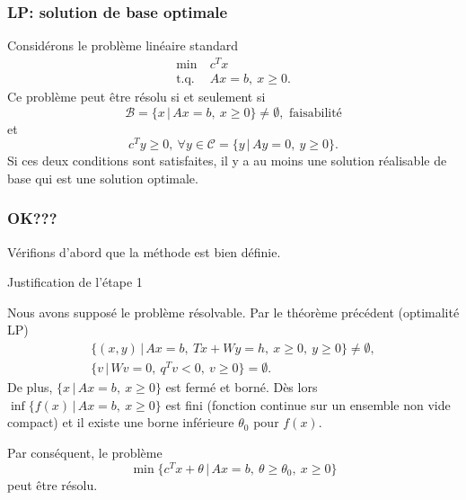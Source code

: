 

\begin{frame}
	\frametitle{LP: solution de base optimale}
	
	\begin{theo}[Optimalité LP]
		Considérons le problème linéaire standard
		\begin{align*}
		\min\ & c^Tx \\
		\mbox{t.q. } & Ax = b,\ x \geq 0.
		\end{align*}
		Ce problème peut être résolu si et seulement si
		\[
		\mathcal{B} = \lbrace x \,|\, Ax = b,\ x \geq 0 \rbrace \ne \emptyset, \mbox{ faisabilité}
		\]
		et
		\[
		c^Ty \geq 0,\ \forall y \in \mathcal{C} = \lbrace y \,|\, Ay = 0,\ y \geq 0 \rbrace.
		\]
		Si ces deux conditions sont satisfaites, il y a au moins une solution
		réalisable de base qui est une solution optimale.
	\end{theo}
\end{frame}

\begin{frame}
	\frametitle{OK???}
	
	Vérifions d'abord que la méthode est bien définie.
	
	\mbox{}
	
	{\red Justification de l'étape 1}
	
	\mbox{}
	
	Nous avons supposé le problème résolvable. Par le théorème précédent
	(optimalité LP)
	\begin{align*}
	\lbrace (x,y) \,|\, Ax = b,\ Tx+Wy = h,\ x \geq 0,\ y \geq 0\rbrace \ne
	\emptyset,\\
	\lbrace v \,|\, Wv = 0,\ q^Tv < 0,\ v \geq 0 \rbrace = \emptyset.
	\end{align*}
	De plus, $\lbrace x \,|\, Ax = b,\ x \geq 0 \rbrace$ est fermé et
	borné. Dès lors
	$\inf \lbrace f(x) \,|\, Ax = b,\ x \geq 0 \rbrace$ est fini (fonction
	continue sur un ensemble non vide compact) et il
	existe une borne inférieure $\theta_0$ pour $f(x)$.
	
	Par conséquent, le problème
	\[
	\min \lbrace c^Tx + \theta \,|\, Ax = b,\ \theta \geq \theta_0,\ x
	\geq 0 \rbrace
	\]
	peut être résolu.
	
\end{frame}

